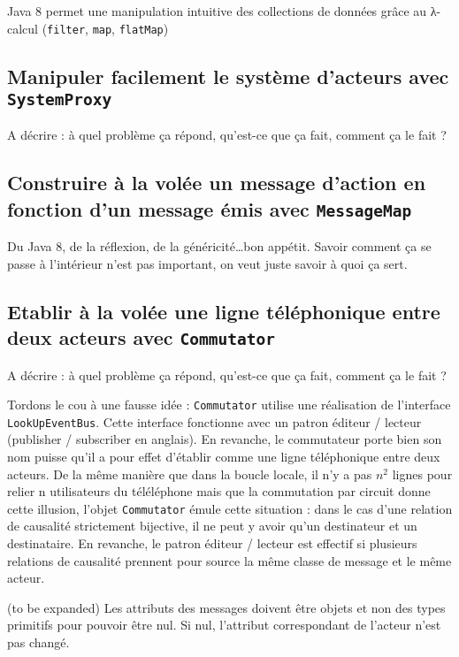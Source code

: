 \documentclass[11pt]{article}
\begin{document}
Java 8 permet une manipulation intuitive des collections de données grâce au λ-calcul (\texttt{filter}, \texttt{map}, \texttt{flatMap})

\subsection{Manipuler facilement le système d'acteurs avec \texttt{SystemProxy}}

A décrire : à quel problème ça répond, qu'est-ce que ça fait, comment ça le fait ?

\subsection{Construire à la volée un message d'action en fonction d'un message émis avec \texttt{MessageMap}}

Du Java 8, de la réflexion, de la généricité\dots bon appétit. Savoir comment ça se passe à l'intérieur n'est pas important, on veut juste savoir à quoi ça sert.

\subsection{Etablir à la volée une ligne téléphonique entre deux acteurs avec \texttt{Commutator}}

A décrire : à quel problème ça répond, qu'est-ce que ça fait, comment ça le fait ?

Tordons le cou à une fausse idée : \texttt{Commutator} utilise une réalisation de l'interface \texttt{LookUpEventBus}. Cette interface fonctionne avec un patron éditeur / lecteur (\og publisher / subscriber \fg{} en anglais). En revanche, le commutateur porte bien son nom puisse qu'il a pour effet d'établir comme une ligne téléphonique entre deux acteurs. De la même manière que dans la boucle locale, il n'y a pas $n^2$ lignes pour relier n utilisateurs du téléléphone mais que la commutation par circuit donne cette illusion, l'objet \texttt{Commutator} émule cette situation : dans le cas d'une relation de causalité strictement bijective, il ne peut y avoir qu'un destinateur et un destinataire. En revanche, le patron éditeur / lecteur est effectif si plusieurs relations de causalité prennent pour source la même classe de message et le même acteur.

(to be expanded) Les attributs des messages doivent être objets et non des types primitifs pour pouvoir être nul. Si nul, l'attribut correspondant de l'acteur n'est pas changé.
\end{document}
